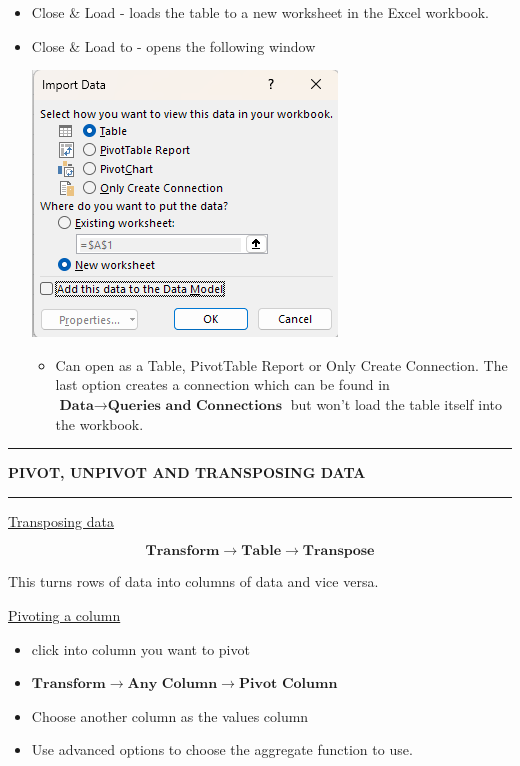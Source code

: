 \documentclass[8pt]{extarticle}
\newcommand{\heading}[1]{%
    \noindent
    \rule{\linewidth}{0.4pt}
    \begin{center}
        \vspace{-1ex}
        \textbf{#1}        
        \vspace{-2.5ex}
    \end{center}
    \rule{\linewidth}{0.4pt}
}
\begin{document}
\begin{multicols}{3}
\begin{itemize}
    \item Close \& Load - loads the table to a new worksheet in the Excel workbook.
    \item Close \& Load to - opens the following window
    \begin{center}
        \includegraphics[width=0.6\columnwidth]{images/close_and_load_to.png}
    \end{center}
    \begin{itemize}
        \item Can open as a Table, PivotTable Report or Only Create Connection. The last option creates a connection which can be found in $\textbf{Data} \rightarrow \textbf{Queries and Connections}$ but won't load the table itself into the workbook.
    \end{itemize}
\end{itemize}
\columnbreak
\heading{PIVOT, UNPIVOT AND TRANSPOSING DATA}

\begin{center}
    \underline{Transposing data}
\end{center}

\[\textbf{Transform} \rightarrow \textbf{Table} \rightarrow \textbf{Transpose}\]

This turns rows of data into columns of data and vice versa.

\begin{center}
    \underline{Pivoting a column}
\end{center}

\begin{itemize}
    \item click into column you want to pivot
    \item $\textbf{Transform} \rightarrow \textbf{Any Column} \rightarrow \textbf{Pivot Column}$
    \item Choose another column as the values column 
    \item Use advanced options to choose the aggregate function to use.
\end{itemize}


\end{multicols}
\end{document}
